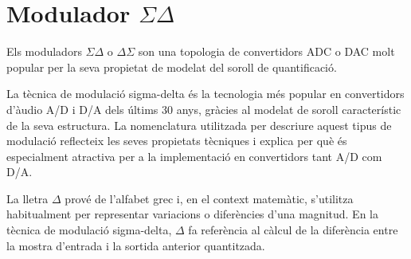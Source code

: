 \section{Modulador $\Sigma \Delta$}
\par Els moduladors $\Sigma \Delta$ o $\Delta \Sigma$ son una topologia de convertidors ADC o DAC molt popular per la seva propietat de modelat del soroll de quantificació. 
\par La tècnica de modulació sigma-delta és la tecnologia més popular en convertidors d'àudio A/D i D/A dels últims 30 anys, gràcies al modelat de soroll característic de la seva estructura. La nomenclatura utilitzada per descriure aquest tipus de modulació reflecteix les seves propietats tècniques i explica per què és especialment atractiva per a la implementació en convertidors tant A/D com D/A.
\par La lletra $\Delta$ prové de l'alfabet grec i, en el context matemàtic, s'utilitza habitualment per representar variacions o diferències d'una magnitud. En la tècnica de modulació sigma-delta, $\Delta$ fa referència al càlcul de la diferència entre la mostra d'entrada i la sortida anterior quantitzada.

